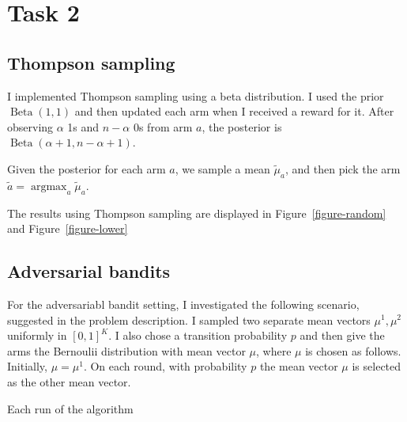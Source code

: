 \documentclass[10pt]{article}
\DeclareMathOperator{\Beta}{Beta}
\DeclareMathOperator{\argmax}{argmax}
\begin{document}
\section{Task 2}

\subsection{Thompson sampling}
I implemented Thompson sampling using a beta distribution. I used the prior
$\Beta(1,1)$ and then updated each arm when I received a reward for it. After
observing $\alpha$ 1s and $n - \alpha$ 0s from arm $a$, the posterior is
$\Beta(\alpha + 1, n - \alpha + 1)$.

Given the posterior for each arm $a$, we sample a mean $\tilde{\mu}_a$, and then pick
the arm $\tilde{a} = \argmax_a \tilde{\mu}_a$.

The results using Thompson sampling are displayed in Figure~\ref{figure-random}
and Figure~\ref{figure-lower}

\subsection{Adversarial bandits}

For the adversariabl bandit setting, I investigated the following scenario,
suggested in the problem description. I sampled two separate mean vectors
$\mu^1, \mu^2$ uniformly in $[0,1]^K$. I also chose a transition probability $p$
and then give the arms the Bernoulii distribution with mean vector $\mu$, where
$\mu$ is chosen as follows.  Initially, $\mu = \mu^1$. On each round, with
probability $p$ the mean vector $\mu$ is selected as the other mean vector.

Each run of the algorithm 
\end{document}
